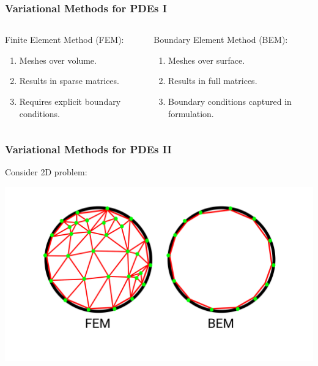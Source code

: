 \begin{frame}
    \frametitle{Variational Methods for PDEs I}

    \begin{columns}

        \begin{column}{0.5\textwidth}

            Finite Element Method (FEM):

            \begin{enumerate}
                \item Meshes over volume.
                \item Results in sparse matrices.
                \item Requires explicit boundary conditions.
            \end{enumerate}
        \end{column}

        \begin{column}{0.5 \textwidth}
            Boundary Element Method (BEM):

            \begin{enumerate}
                \item Meshes over surface.
                \item Results in full matrices.
                \item Boundary conditions captured in formulation.
            \end{enumerate}
        \end{column}
    \end{columns}
\end{frame}

\begin{frame}
\frametitle{Variational Methods for PDEs II}
    Consider 2D problem:

    \includegraphics[width=\linewidth]{assets/fem_bem.pdf}
\end{frame}

